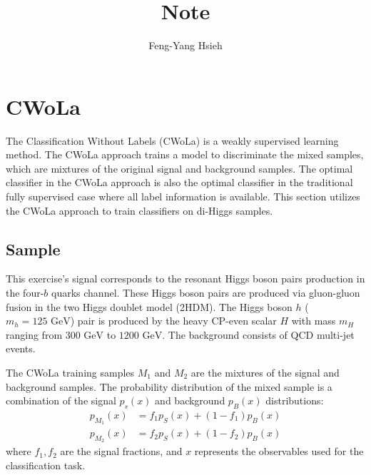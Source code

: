 \documentclass[12pt]{article}
\title{Note}
\author{Feng-Yang Hsieh}
\date{}
\begin{document}
\maketitle

\section{CWoLa}%
\label{sec:cwola}
	The Classification Without Labels (CWoLa) is a weakly supervised learning method. The CWoLa approach trains a model to discriminate the mixed samples, which are mixtures of the original signal and background samples. The optimal classifier in the CWoLa approach is also the optimal classifier in the traditional fully supervised case where all label information is available. This section utilizes the CWoLa approach to train classifiers on di-Higgs samples.

	\subsection{Sample}%
	\label{sub:sample}
		This exercise's signal corresponds to the resonant Higgs boson pairs production in the four-$b$ quarks channel. These Higgs boson pairs are produced via gluon-gluon fusion in the two Higgs doublet model (2HDM). The Higgs boson $h$ ($m_h = \text{125 GeV}$) pair is produced by the heavy CP-even scalar $H$ with mass $m_H$ ranging from $\text{300 GeV}$ to $\text{1200 GeV}$. The background consists of QCD multi-jet events.

		The CWoLa training samples $M_1$ and $M_2$ are the mixtures of the signal and background samples. The probability distribution of the mixed sample is a combination of the signal $p_s(x)$ and background $p_B(x)$ distributions:
		\begin{equation}
			\begin{aligned}
				p_{M_1}(x) &=  f_1 p_S(x) + (1-f_1) p_B(x) \\
				p_{M_2}(x) &=  f_2 p_S(x) + (1-f_2) p_B(x)
			\end{aligned}
		\end{equation}
		where $f_1, f_2$ are the signal fractions, and $x$ represents the observables used for the classification task.
\end{document}
